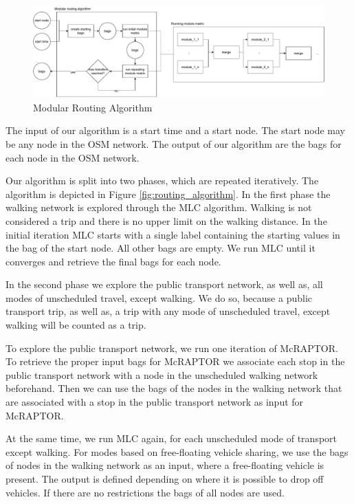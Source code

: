 \begin{figure}
    \centering
    \includegraphics[scale=0.40]{Figures/method/modular_routing_algorithm}
    \caption{Modular Routing Algorithm}
    \label{fig:modular_routing_algorithm}
\end{figure}



The input of our algorithm is a start time and a start node.
The start node may be any node in the OSM network.
The output of our algorithm are the bags for each node in the OSM network.

Our algorithm is split into two phases, which are repeated iteratively.
The algorithm is depicted in Figure \ref{fig:routing_algorithm}.
In the first phase the walking network is explored through the MLC algorithm.
Walking is not considered a trip and there is no upper limit on the walking distance.
In the initial iteration MLC starts with a single label containing the starting values in the bag of the start node.
All other bags are empty.
We run MLC until it converges and retrieve the final bags for each node.

In the second phase we explore the public transport network, as well as, all modes of unscheduled travel, except walking.
We do so, because a public transport trip, as well as, a trip with any mode of unscheduled travel, except walking will be counted as a trip.

To explore the public transport network, we run one iteration of McRAPTOR.
To retrieve the proper input bags for McRAPTOR we associate each stop in the public transport network with a node in the unscheduled walking network beforehand.
Then we can use the bags of the nodes in the walking network that are associated with a stop in the public transport network as input for McRAPTOR.

At the same time, we run MLC again, for each unscheduled mode of transport except walking.
For modes based on free-floating vehicle sharing, we use the bags of nodes in the walking network as an input, where a free-floating vehicle is present.
The output is defined depending on where it is possible to drop off vehicles.
If there are no restrictions the bags of all nodes are used.

